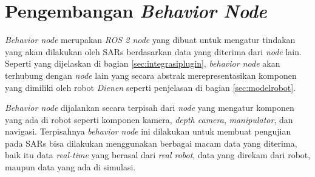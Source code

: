 \section{Pengembangan \emph{Behavior Node}}
\label{sec:behaviornode}

\emph{Behavior node} merupakan \emph{ROS 2 node} yang dibuat untuk mengatur tindakan yang akan dilakukan oleh SARs berdasarkan data yang diterima dari \emph{node} lain.
Seperti yang dijelaskan di bagian \ref{sec:integrasiplugin},
  \emph{behavior node} akan terhubung dengan \emph{node} lain yang secara abstrak merepresentasikan komponen yang dimiliki oleh robot \emph{Dienen} seperti penjelasan di bagian \ref{sec:modelrobot}.

\emph{Behavior node} dijalankan secara terpisah dari \emph{node} yang mengatur komponen yang ada di robot seperti komponen kamera, \emph{depth camera}, \emph{manipulator}, dan navigasi.
Terpisahnya \emph{behavior node} ini dilakukan untuk membuat pengujian pada SARs bisa dilakukan menggunakan berbagai macam data yang diterima,
  baik itu data \emph{real-time} yang berasal dari \emph{real robot},
  data yang direkam dari robot,
  maupun data yang ada di simulasi.

